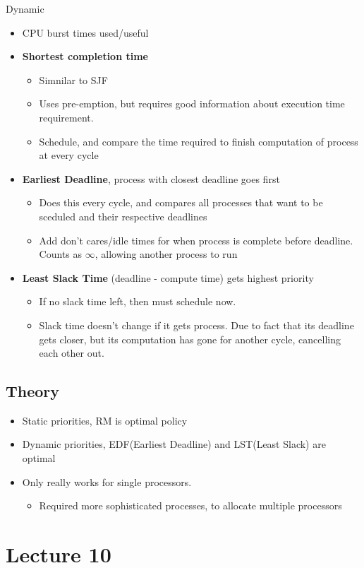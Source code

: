 \documentclass{article}
\begin{document}
		Dynamic
		\begin{itemize}
			\item CPU burst times used/useful
			\item \textbf{Shortest completion time}
			\begin{itemize}
				\item Simnilar to SJF
				\item Uses pre-emption, but requires good information about execution time requirement.
				\item Schedule, and compare the time required to finish computation of process at every cycle
			\end{itemize}
			\item \textbf{Earliest Deadline}, process with closest deadline goes first
			\begin{itemize}
				\item Does this every cycle, and compares all processes that want to be sceduled and their respective deadlines
				\item Add don't cares/idle times for when process is complete before deadline. Counts as $\infty$, allowing another process to run
			\end{itemize}
			\item \textbf{Least Slack Time} (deadline - compute time) gets highest priority
			\begin{itemize}
				\item If no slack time left, then must schedule now.
				\item Slack time doesn't change if it gets process. Due to fact that its deadline gets closer, but its computation has gone for another cycle, cancelling each other out.
			\end{itemize}
		\end{itemize}

	\subsection{Theory} 
		\begin{itemize}
			\item Static priorities, RM is optimal policy
			\item Dynamic priorities, EDF(Earliest Deadline) and LST(Least Slack) are optimal
			\item Only really works for single processors.
			\begin{itemize}
				\item Required more sophisticated processes, to allocate multiple processors
			\end{itemize}
		\end{itemize}

\section{Lecture 10}
	









				
				

		
\end{document}
